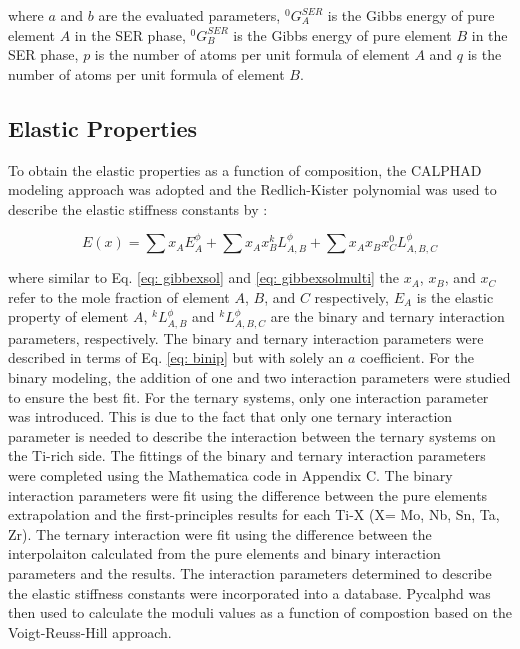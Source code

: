 \noindent where $a$ and $b$ are the evaluated parameters, $^{0}G_{A}^{SER}$ is the Gibbs energy of pure element $A$ in the SER phase, $^{0}G_{B}^{SER}$ is the Gibbs energy of pure element $B$ in the SER phase, $p$ is the number of atoms per unit formula of element $A$ and $q$ is the number of atoms per unit formula of element $B$.

\subsection{Elastic Properties}

To obtain the elastic properties as a function of composition, the CALPHAD modeling approach was adopted and the Redlich-Kister polynomial was used to describe the elastic stiffness constants by \cite{Redlich1948b,Shang2010c}: 

\begin{equation}
\label{eq: elastic}
E(x) = \sum x_{A} E_{A}^{\phi} + \sum x_{A} x_{B} ^{k}L_{A,B}^{\phi} + \sum x_{A} x_{B} x_{C} ^{0}L_{A, B, C}^{\phi}
\end{equation}

\noindent where similar to Eq. \ref{eq: gibbexsol} and \ref{eq: gibbexsolmulti} the $x_A$, $x_B$, and $x_C$ refer to the mole fraction of element $A$, $B$, and $C$ respectively, $E_{A}$ is the elastic property of element $A$, $^{k}L_{A,B}^{\phi}$ and $^{k}L_{A,B,C}^{\phi}$ are the binary and ternary interaction parameters, respectively. The binary and ternary interaction parameters were described in terms of Eq. \ref{eq: binip} but with solely an $a$ coefficient. For the binary modeling, the addition of one and two interaction parameters were studied to ensure the best fit. For the ternary systems, only one interaction parameter was introduced. This is due to the fact that only one ternary interaction parameter is needed to describe the interaction between the ternary systems on the Ti-rich side. The fittings of the binary and ternary interaction parameters were completed using the Mathematica code in Appendix C. The binary interaction parameters were fit using the difference between the pure elements extrapolation and the first-principles results for each Ti-X (X= Mo, Nb, Sn, Ta, Zr). The ternary interaction were fit using the difference between the interpolaiton calculated from the pure elements and binary interaction parameters and the results. The interaction parameters determined to describe the elastic stiffness constants were incorporated into a database. Pycalphd \cite{Otis2017} was then used to calculate the moduli values as a function of compostion based on the Voigt-Reuss-Hill approach.


